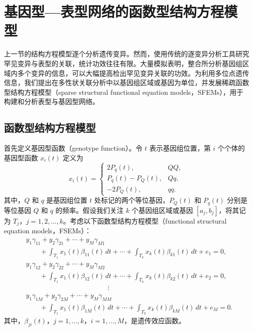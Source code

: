 \FloatBarrier
\section{基因型—表型网络的函数型结构方程模型}
\label{sec:ch01c-functional}

上一节的结构方程模型逐个分析遗传变异。然而，使用传统的逐变异分析工具研究罕见变异与表型的关联，统计功效往往有限。大量模拟表明，整合所分析基因组区域内多个变异的信息，可以大幅提高检出罕见变异关联的功效。为利用多位点遗传信息，我们提出在多性状关联分析中以基因组区域或基因为单位，并发展稀疏函数型结构方程模型（sparse structural functional equation models，SFEMs），用于构建和分析表型与基因型网络。

\subsection{函数型结构方程模型}

首先定义基因型函数（genotype function）。令 $t$ 表示基因组位置，第 $i$ 个个体的基因型函数 $x_i(t)$ 定义为
\[
x_i(t)=
\begin{cases}
2P_q(t),& QQ,\\
P_q(t)-P_Q(t),& Qq,\\
-2P_Q(t),& qq.
\end{cases}
\]
其中，$Q$ 和 $q$ 是基因组位置 $t$ 处标记的两个等位基因，$P_Q(t)$ 和 $P_q(t)$ 分别是等位基因 $Q$ 和 $q$ 的频率。假设我们关注 $k$ 个基因组区域或基因 $[a_j,b_j]$，将其记为 $T_j$，$j=1,2,\ldots,k$。考虑以下函数型结构方程模型（functional structural equation models，FSEMs）：
\begin{equation}
\begin{aligned}
&y_1\gamma_{11}+y_2\gamma_{21}+\cdots+y_M\gamma_{M1}\\
&\qquad+\int_{T_1}x_1(t)\beta_{11}(t)\,dt+\cdots
 +\int_{T_k}x_k(t)\beta_{k1}(t)\,dt+e_1=0,\\
&y_1\gamma_{12}+y_2\gamma_{22}+\cdots+y_M\gamma_{M2}\\
&\qquad+\int_{T_1}x_1(t)\beta_{12}(t)\,dt+\cdots
 +\int_{T_k}x_k(t)\beta_{k2}(t)\,dt+e_2=0,\\
&\hspace{12em}\vdots\\
&y_1\gamma_{1M}+y_2\gamma_{2M}+\cdots+y_M\gamma_{MM}\\
&\qquad+\int_{T_1}x_1(t)\beta_{1M}(t)\,dt+\cdots
 +\int_{T_k}x_k(t)\beta_{kM}(t)\,dt+e_M=0.
\end{aligned}
\tag{1.104}
\end{equation}
其中，$\beta_{ji}(t)$，$j=1,\ldots,k$，$i=1,\ldots,M$，是遗传效应函数。


